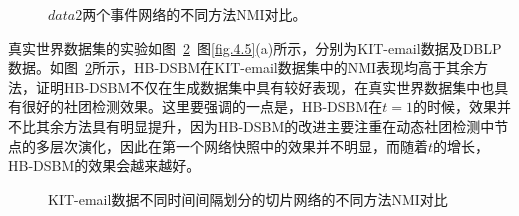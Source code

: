 \begin{figure}[htbp]
	\centering
	\caption{$data2$两个事件网络的不同方法NMI对比。}
	\label{fig.4.3}
\end{figure}

真实世界数据集的实验如图~\ref{fig.4.4}~图\ref{fig.4.5}(a)所示，分别为KIT-email数据及DBLP数据。如图~\ref{fig.4.4}所示，HB-DSBM在KIT-email数据集中的NMI表现均高于其余方法，证明HB-DSBM不仅在生成数据集中具有较好表现，在真实世界数据集中也具有很好的社团检测效果。这里要强调的一点是，HB-DSBM在$t=1$的时候，效果并不比其余方法具有明显提升，因为HB-DSBM的改进主要注重在动态社团检测中节点的多层次演化，因此在第一个网络快照中的效果并不明显，而随着$t$的增长，HB-DSBM的效果会越来越好。




\begin{figure}[htbp]
	\centering
	\caption{KIT-email数据不同时间间隔划分的切片网络的不同方法NMI对比}
	\label{fig.4.4}
\end{figure}


